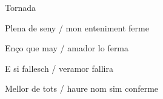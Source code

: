 \documentclass[12pt]{article}
\begin{document}
\begin{estrofaExtra}%




\begin{tornada}

\pagina{[60r]} Tornada

\end{tornada}


\end{estrofaExtra}


\begin{estrofa}

 Plena de seny / mon enteniment ferme

 En\c{c}o que may / amador lo ferma

 E si fallesch / veramor fallira

 Mellor de tots / haure nom sim conferme

\end{estrofa}
\end{document}
